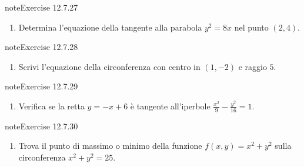 \documentclass[letterpaper,10pt,italian]{jupyterBook}
\begin{document}
\begin{sphinxadmonition}{note}{Exercise 12.7.27}


\begin{enumerate}
%
\setcounter{enumi}{26}
\item {} 
\sphinxAtStartPar
Determina l’equazione della tangente alla parabola \( y^2 = 8x \) nel punto \( (2, 4) \).

\end{enumerate}
\end{sphinxadmonition}
 \label{exercise:ch/analytic_geometry/analytic_geometry_2d/sol-exercise-27}

\begin{sphinxadmonition}{note}{Exercise 12.7.28}


\begin{enumerate}
%
\setcounter{enumi}{27}
\item {} 
\sphinxAtStartPar
Scrivi l’equazione della circonferenza con centro in \( (1, -2) \) e raggio \( 5 \).

\end{enumerate}
\end{sphinxadmonition}
 \label{exercise:ch/analytic_geometry/analytic_geometry_2d/sol-exercise-28}

\begin{sphinxadmonition}{note}{Exercise 12.7.29}


\begin{enumerate}
%
\setcounter{enumi}{28}
\item {} 
\sphinxAtStartPar
Verifica se la retta \( y = -x + 6 \) è tangente all’iperbole \( \frac{x^2}{9} - \frac{y^2}{16} = 1 \).

\end{enumerate}
\end{sphinxadmonition}
 \label{exercise:ch/analytic_geometry/analytic_geometry_2d/sol-exercise-29}

\begin{sphinxadmonition}{note}{Exercise 12.7.30}


\begin{enumerate}
%
\setcounter{enumi}{29}
\item {} 
\sphinxAtStartPar
Trova il punto di massimo o minimo della funzione \( f(x, y) = x^2 + y^2 \) sulla circonferenza \( x^2 + y^2 = 25 \).

\end{enumerate}
\end{sphinxadmonition}
\end{document}
